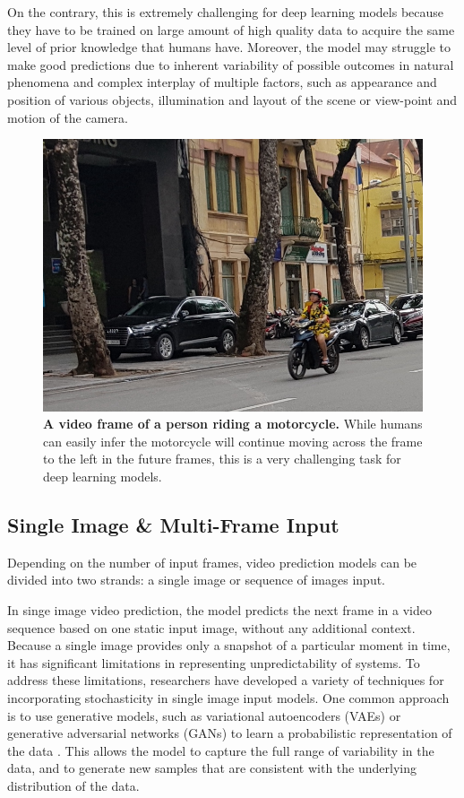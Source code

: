 \documentclass{l4proj}
\begin{document}
On the contrary, this is extremely challenging for deep learning models because they have to be trained on large amount of high quality data to acquire the same level of prior knowledge that humans have. Moreover, the model may struggle to make good predictions due to inherent variability of possible outcomes in natural phenomena and complex interplay of multiple factors, such as appearance and position of various objects, illumination and layout of the scene or view-point and motion of the camera.

\begin{figure}
    \centering
    \includegraphics[width=0.6\linewidth]{images/motorbike.JPG}    
    \caption{\textbf{A video frame of a person riding a motorcycle.} While humans can easily infer the motorcycle will continue moving across the frame to the left in the future frames, this is a very challenging task for deep learning models.}
    \label{fig:motorbike} 
\end{figure}

\subsection{Single Image \& Multi-Frame Input}
Depending on the number of input frames, video prediction models can be divided into two strands: a single image or sequence of images input.

In singe image video prediction, the model predicts the next frame in a video sequence based on one static input image, without any additional context. Because a single image provides only a snapshot of a particular moment in time, it has significant limitations in representing unpredictability of systems. To address these limitations, researchers have developed a variety of techniques for incorporating stochasticity in single image input models. One common approach is to use generative models, such as variational autoencoders (VAEs) or generative adversarial networks (GANs) to learn a probabilistic representation of the data \citep{DBLP:journals/corr/XueWBF16, DBLP:journals/corr/WalkerDGH16, DBLP:journals/corr/abs-1802-07687, DBLP:journals/corr/abs-1804-01523}. This allows the model to capture the full range of variability in the data, and to generate new samples that are consistent with the underlying distribution of the data.
\end{document}
